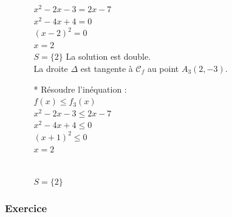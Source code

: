 \begin{enumerate}
\begin{itemize}
$ x^2 -2x -3 = 2x - 7$\\
$ x^2 -4x  + 4 = 0 $\\
$(x - 2)^2 = 0  $\\
$x = 2$ \\

$S=\{2\}$ La solution est double.\\

La droite $\Delta$ est tangente à $\mathcal{C}_f$ au point $A_3(2, -3)$.
               
\item [*] Résoudre l'inéquation : \\

$f(x) \leqslant f_3(x)$\\
$ x^2 -2x -3 \leqslant 2x - 7$\\
$ x^2 -4x  + 4 \leqslant 0 $\\
$(x + 1)^2 \leqslant 0  $\\
$x = 2$ \\

 \\

$S = \{2\}$ \\

\end{itemize} 
\end{enumerate}

\newpage

\subsubsection{Exercice }

